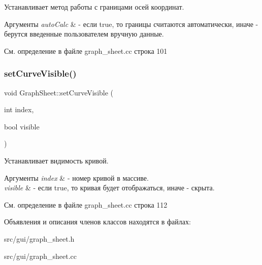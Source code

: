 Устанавливает метод работы с границами осей координат. 


\begin{DoxyParams}{Аргументы}
{\em auto\+Calc} & -\/ если true, то границы считаются автоматически, иначе -\/ берутся введенные пользователем вручную данные. \\
\hline
\end{DoxyParams}


См. определение в файле graph\+\_\+sheet.\+cc строка 101

\hypertarget{class_graph_sheet_af8f3efaf2a6ba860b089bef15e07f403}{}\label{class_graph_sheet_af8f3efaf2a6ba860b089bef15e07f403} 
\subsubsection{\texorpdfstring{set\+Curve\+Visible()}{setCurveVisible()}}
{\footnotesize\ttfamily void Graph\+Sheet\+::set\+Curve\+Visible (\begin{DoxyParamCaption}\item[{int}]{index,  }\item[{bool}]{visible }\end{DoxyParamCaption})}



Устанавливает видимость кривой. 


\begin{DoxyParams}{Аргументы}
{\em index} & -\/ номер кривой в массиве. \\
\hline
{\em visible} & -\/ если true, то кривая будет отображаться, иначе -\/ скрыта. \\
\hline
\end{DoxyParams}


См. определение в файле graph\+\_\+sheet.\+cc строка 112



Объявления и описания членов классов находятся в файлах\+:\begin{DoxyCompactItemize}
\item 
src/gui/graph\+\_\+sheet.\+h\item 
src/gui/graph\+\_\+sheet.\+cc\end{DoxyCompactItemize}
